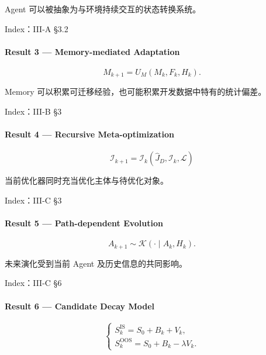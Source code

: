 Agent 可以被抽象为与环境持续交互的状态转换系统。

Index：III-A §3.2

\hypertarget{part-3-48-0001-result-3-memory-mediated-adaptation}{%
\paragraph{Result 3 --- Memory-mediated Adaptation}\label{part-3-48-0001-result-3-memory-mediated-adaptation}}

\[M_{k+1}=U_M(M_k,F_k,H_k).\]

Memory 可以积累可迁移经验，也可能积累开发数据中特有的统计偏差。

Index：III-B §3

\hypertarget{part-3-48-0001-result-4-recursive-meta-optimization}{%
\paragraph{Result 4 --- Recursive Meta-optimization}\label{part-3-48-0001-result-4-recursive-meta-optimization}}

\[\boxed{
\mathcal I_{k+1}
=
\mathcal I_k
(\widehat J_D,\mathcal I_k,\mathcal L)
}\]

当前优化器同时充当优化主体与待优化对象。

Index：III-C §3

\hypertarget{part-3-48-0001-result-5-path-dependent-evolution}{%
\paragraph{Result 5 --- Path-dependent Evolution}\label{part-3-48-0001-result-5-path-dependent-evolution}}

\[A_{k+1}\sim\mathcal K(\cdot\mid A_k,H_k).\]

未来演化受到当前 Agent 及历史信息的共同影响。

Index：III-C §6

\hypertarget{part-3-48-0001-result-6-candidate-decay-model}{%
\paragraph{Result 6 --- Candidate Decay Model}\label{part-3-48-0001-result-6-candidate-decay-model}}

\[\begin{cases}
S_k^{\mathrm{IS}}=S_0+B_k+V_k,\\
S_k^{\mathrm{OOS}}=S_0+B_k-\lambda V_k.
\end{cases}\]

